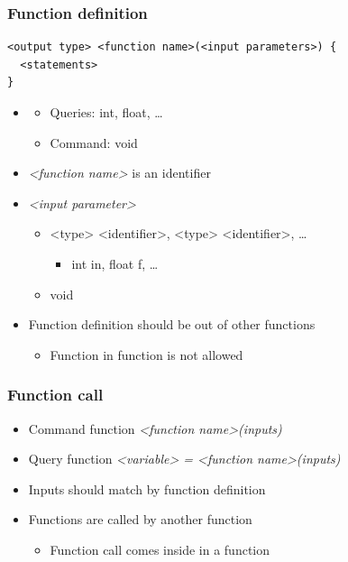 \documentclass{../c-lecture}
\begin{document}
\begin{frame}[fragile]
  \frametitle{Function \textbf{definition}}
  \begin{verbatim}
<output type> <function name>(<input parameters>) {
  <statements>
}
  \end{verbatim}
  \begin{itemize}
    \item <output type>
    \begin{itemize}
      \item \textmd{\color{Orange} Queries}: int, float, \ldots
      \item \textmd{\color{LimeGreen} Command}: void
    \end{itemize}
    \item
      \textit{\color{LimeGreen} <function name>} is an identifier
    \item \textit{\color{Cyan} <input parameter>}
    \begin{itemize}
      \item
        <type> <identifier>, <type> <identifier>, \ldots
      \begin{itemize}
        \item int in, float f, \ldots
      \end{itemize}
      \item void
    \end{itemize}
  \end{itemize}
\end{frame}

\begin{frame}
  \begin{itemize}
    \item Function definition should be out of other functions
    \begin{itemize}
      \item Function in function is not allowed
    \end{itemize}
  \end{itemize}
\end{frame}

\begin{frame}
  \frametitle{Function call}
  \begin{itemize}
    \item Command function
    \textit{\color{LimeGreen} <function name>(inputs)}
    \item Query function
    \textit{\color{LimeGreen} <variable> = <function name>(inputs)}
    \item Inputs should match by function definition
    \item Functions are called by another function
    \begin{itemize}
      \item Function call comes inside in a function
    \end{itemize}
  \end{itemize}
\end{frame}
\end{document}

